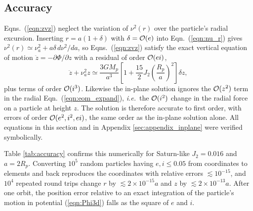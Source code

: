 
\subsection{Accuracy}
\label{sec:accuracy}

Eqns.\ (\ref{eqn:zvz}) neglect the variation of $\nu^2(r)$ over the particle's radial
excursion. Inserting $r = a(1 + \delta)$ with $\delta = {\cal O}(e)$ into Eqn.\ (\ref{eqn:nu_r})
gives $\nu^2(r) \simeq \nu_a^2 + a\delta\,d\nu^2/da$, so Eqns.\ (\ref{eqn:zvz}) satisfy the exact
vertical equation of motion $\ddot{z} = -\partial\Phi/\partial z$ with a residual of order
${\cal O}(ei)$,
\begin{equation}
    \label{eqn:residual}
    \ddot{z} + \nu_a^2z \simeq \frac{3GM_p}{a^3}\left[1 + \frac{15}{2}J_2\left(\frac{R_p}{a}\right)^2\right]\delta z,
\end{equation}
plus terms of order ${\cal O}(i^3)$. Likewise the in-plane solution ignores the ${\cal O}(z^2)$
term in the radial Eqn.\ (\ref{eqn:eom_expand}), {\it i.e.}\ the ${\cal O}(i^2)$ change in the
radial force on a particle at height $z$. The solution is therefore accurate to first order,
with errors of order ${\cal O}(e^2, i^2, ei)$, the same order as the in-plane solution alone.
All equations in this section and in Appendix \ref{sec:appendix_inplane} were verified
symbolically.

Table \ref{tab:accuracy} confirms this numerically for Saturn-like $J_2 = 0.016$ and $a = 2R_p$.
Converting $10^5$ random particles having $e, i \le 0.05$ from coordinates to elements and
back reproduces the coordinates with relative errors $\lesssim 10^{-15}$, and $10^4$ repeated
round trips change $r$ by $\lesssim 2\times10^{-15}a$ and $z$ by $\lesssim 2\times10^{-13}a$.
After one orbit, the position error relative to an exact integration of the particle's motion
in potential (\ref{eqn:Phi3d}) falls as the square of $e$ and $i$.

